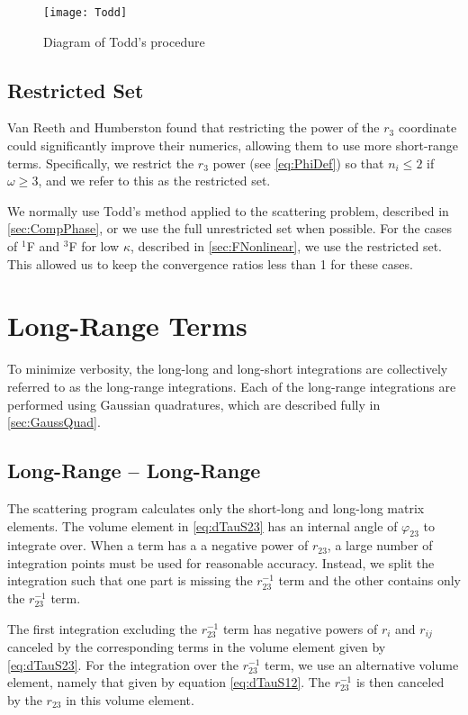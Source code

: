 \documentclass[Dissertation.tex]{subfiles}
\begin{document}
\begin{figure}
	\centering
	{\texttt{[image: Todd]}}
	\caption{Diagram of Todd's procedure}
	\label{fig:Todd}
\end{figure}



\subsection{Restricted Set}
\label{sec:Restricted}
Van Reeth and Humberston \cite{VanReeth2003} found that restricting the power 
of the $r_3$ coordinate could significantly improve their numerics, allowing 
them to use more short-range terms. Specifically, we restrict the $r_3$ power 
(see \cref{eq:PhiDef}) so that $n_i \leq 2$ if $\omega \geq 3$, and we refer 
to this as the restricted set.

We normally use Todd's method applied to the scattering problem,
described in \cref{sec:CompPhase}, or we 
use the full unrestricted set when possible. For the cases of $^1$F and $^3$F 
for low $\kappa$, described in \cref{sec:FNonlinear}, we use the restricted 
set. This allowed us to keep the convergence ratios less than 1 for these
cases.


\section{Long-Range Terms}
\label{sec:CompLong}

To minimize verbosity, the long-long and long-short integrations are 
collectively referred to as the long-range integrations. Each of the
long-range integrations are performed using Gaussian quadratures, which
are described fully in \cref{sec:GaussQuad}. 


\subsection{Long-Range -- Long-Range}
\label{sec:LongLongInt}

The scattering program calculates only the short-long and long-long matrix 
elements. The volume element in \cref{eq:dTauS23} has an internal angle 
of $\varphi_{23}$ to integrate over.  When a term has a a negative power of
$r_{23}$, a large number of integration points must be used for reasonable 
accuracy. Instead, we split the integration such that one part is missing 
the $r_{23}^{-1}$ term and the other contains only the $r_{23}^{-1}$ term.

The first integration excluding the $r_{23}^{-1}$ term has negative powers of 
$r_i$ and $r_{ij}$ canceled by the corresponding terms in the volume element 
given by \cref{eq:dTauS23}. For the integration over the $r_{23}^{-1}$ term, 
we use an alternative volume element, namely that given by equation
\cref{eq:dTauS12}.
The $r_{23}^{-1}$ is then canceled by the $r_{23}$ in this volume element.
\end{document}
